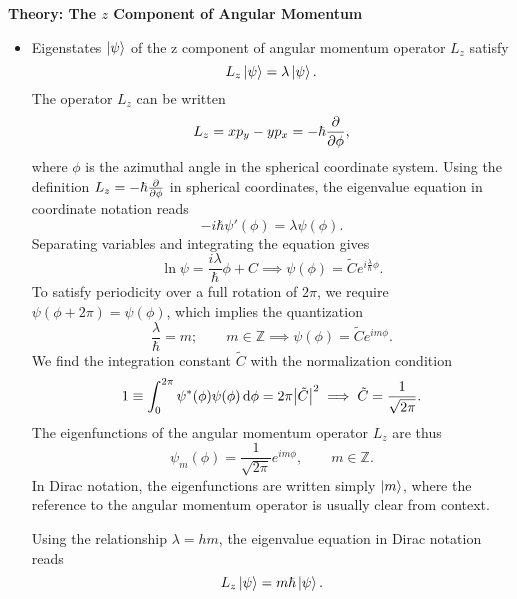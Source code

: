 \documentclass[11pt, a4paper]{article}
\newcommand{\diff}{\mathop{}\!\mathrm{d}} %
\begin{document}
\textbf{Theory: The $ z $ Component of Angular Momentum}
\begin{itemize}
	\item Eigenstates $ \ket{\psi} $ of the z component of angular momentum operator $ L_{z} $ satisfy
	\begin{equation*}
		L_{z}\ket{\psi} = \lambda \ket{\psi}.
	\end{equation*}
	The operator $ L_{z} $ can be written
	\begin{equation*}
		L_{z} = xp_{y} - y p_{x} = - \hbar \pdv{\phi},
	\end{equation*}
	where $ \phi $ is the azimuthal angle in the spherical coordinate system. Using the definition $ L_{z} = - \hbar \pdv{\phi} $ in spherical coordinates, the eigenvalue equation in coordinate notation reads
	\begin{equation*}
		-i\hbar \psi'(\phi) = \lambda \psi(\phi).
	\end{equation*}
	Separating variables and integrating the equation gives
	\begin{equation*}
		\ln \psi = \frac{i\lambda}{\hbar} \phi + C \implies \psi(\phi) = \tilde{C}e^{i\frac{\lambda}{\hbar}\phi}.
	\end{equation*}
	To satisfy periodicity over a full rotation of $ 2\pi $, we require $ \psi(\phi + 2\pi) = \psi(\phi) $, which implies the quantization
	\begin{equation*}
		\frac{\lambda}{\hbar} = m; \qquad m \in \mathbb{Z} \implies \psi(\phi) = \tilde{C}e^{im\phi}.
	\end{equation*}
	We find the integration constant $ \tilde{C} $ with the normalization condition
	\begin{equation*}
		1 \equiv \int_{0}^{2\pi}\psi^{*}(\phi)\psi(\phi)\diff \phi = 2\pi \abs{\tilde{C}}^{2} \implies \tilde{C} = \frac{1}{\sqrt{2\pi}}.
	\end{equation*}
	The eigenfunctions of the angular momentum operator $ L_{z} $ are thus
	\begin{equation*}
		\psi_{m}(\phi) = \frac{1}{\sqrt{2\pi}}e^{im\phi}, \qquad m \in \mathbb{Z}.
	\end{equation*}
	In Dirac notation, the eigenfunctions are written simply $ \ket{m} $, where the reference to the angular momentum operator is usually clear from context. 
	
	Using the relationship $ \lambda = h m $, the eigenvalue equation in Dirac notation reads
	\begin{equation*}
		L_{z}\ket{\psi} = m \hbar \ket{\psi}.
	\end{equation*}
	
	
\end{itemize}
\end{document}
